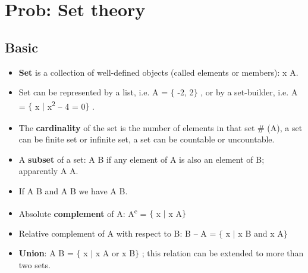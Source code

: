 \documentclass[12pt]{report}
\renewcommand{\_}{\kern-1.5pt\textunderscore\kern-1.5pt}
\begin{document}

\tableofcontents
{}

\vspace{\baselineskip}

\vspace{\baselineskip}
\section*{Prob: Set theory }
\subsection*{Basic}
\begin{itemize}
	\item \textbf{Set} is a collection of well-defined objects (called elements or members): x  A.\par

	\item Set can be represented by a list, i.e. A = $ \{ $ -2, 2$ \} $ , or by a set-builder, i.e. A = $ \{ $ x $ \vert $  x\textsuperscript{2}\textsubscript{ }– 4 = 0$ \} $ .\par

	\item The \textbf{cardinality} of the set is the number of elements in that set $\#$ (A), a set can be finite set or infinite set, a set can be countable or uncountable.\par

	\item A \textbf{subset} of a set: A  B if any element of A is also an element of B; apparently   A  A. \par

	\item If A  B and A  B we have A  B.\par

	\item Absolute \textbf{complement} of A: A\textsuperscript{c} = $ \{ $ x $ \vert $  x  A$ \} $ \par

	\item Relative complement of A with respect to B: B – A = $ \{ $ x $ \vert $  x  B and x  A$ \} $ \par

	\item \textbf{Union}: A  B = $ \{ $ x $ \vert $  x  A or x  B$ \} $ ; this relation can be extended to more than two sets.\par


\end{itemize}
\end{document}
